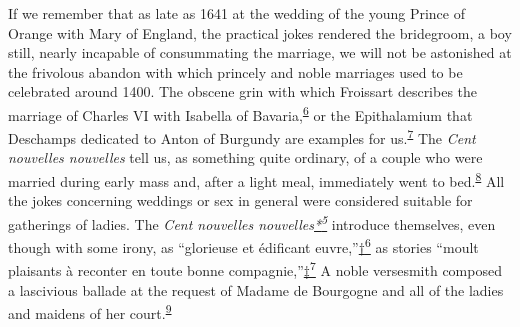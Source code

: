 If we remember that as late as 1641 at the wedding of the young Prince
of Orange with Mary of England, the practical jokes rendered the
bridegroom, a boy still, nearly incapable of consummating the marriage,
we will not be astonished at the frivolous abandon with which princely
and noble marriages used to be celebrated around 1400. The obscene grin
with which Froissart describes the marriage of Charles VI with Isabella
of
Bavaria,\textsuperscript{\protect\hypertarget{11_Chapter_Four__THE_FORMS_OF_LOVE.xhtmlux5cux23id_1476}{\protect\hyperlink{23_NOTES.xhtmlux5cux23id_1477}{6}}}
or the Epithalamium that Deschamps dedicated to Anton of Burgundy are
examples for
us.\textsuperscript{\protect\hypertarget{11_Chapter_Four__THE_FORMS_OF_LOVE.xhtmlux5cux23id_1474}{\protect\hyperlink{23_NOTES.xhtmlux5cux23id_1475}{7}}}
The \emph{Cent nouvelles nouvelles} tell us, as something quite
ordinary, of a couple who were married during early mass and, after a
light meal, immediately went to
bed.\textsuperscript{\protect\hypertarget{11_Chapter_Four__THE_FORMS_OF_LOVE.xhtmlux5cux23id_1472}{\protect\hyperlink{23_NOTES.xhtmlux5cux23id_1473}{8}}}
All the jokes
concern\protect\hypertarget{11_Chapter_Four__THE_FORMS_OF_LOVE.xhtmlux5cux23page_130}{}{}ing
weddings or sex in general were considered suitable for gatherings of
ladies. The \emph{Cent nouvelles
nouvelles\protect\hypertarget{11_Chapter_Four__THE_FORMS_OF_LOVE.xhtmlux5cux23id_3109}{\protect\hyperlink{23_NOTES.xhtmlux5cux23id_3110}{*\textsuperscript{5}}}}
introduce themselves, even though with some irony, as ``glorieuse et
édificant
euvre,''\protect\hypertarget{11_Chapter_Four__THE_FORMS_OF_LOVE.xhtmlux5cux23id_3111}{\protect\hyperlink{23_NOTES.xhtmlux5cux23id_3112}{†\textsuperscript{6}}}
as stories ``moult plaisants à reconter en toute bonne
compagnie,''\protect\hypertarget{11_Chapter_Four__THE_FORMS_OF_LOVE.xhtmlux5cux23id_3113}{\protect\hyperlink{23_NOTES.xhtmlux5cux23id_3114}{‡\textsuperscript{7}}}
A noble versesmith composed a lascivious ballade at the request of
Madame de Bourgogne and all of the ladies and maidens of her
court.\textsuperscript{\protect\hypertarget{11_Chapter_Four__THE_FORMS_OF_LOVE.xhtmlux5cux23id_1470}{\protect\hyperlink{23_NOTES.xhtmlux5cux23id_1471}{9}}}

